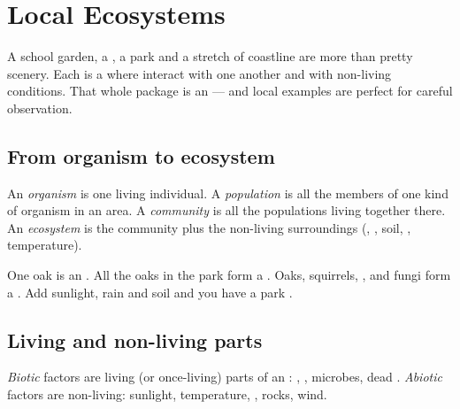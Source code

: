 \chapter{Local Ecosystems}\label{ch:g4:ecosystems}

A school garden, a , a park and a stretch of coastline are more than
pretty scenery. Each is a  where  interact with one
another and with non-living conditions. That whole package is an
 --- and local examples are perfect for careful observation.

\section{From organism to ecosystem}

\begin{definition}\label{def:g4:ecosystems:levels}
An \emph{organism} is one living individual. A
\emph{population} is all the members of one kind of
organism in an area. A \emph{community} is all the
populations living together there. An
\emph{ecosystem} is the community plus the non-living
surroundings (, , soil, , temperature).
\end{definition}

\begin{example}\label{ex:g4:ecosystems:park}
One oak is an . All the oaks in the park form a .
Oaks, squirrels, ,  and fungi form a . Add
sunlight, rain and soil and you have a park .
\end{example}

\section{Living and non-living parts}

\begin{definition}\label{def:g4:ecosystems:bio-abio}
\emph{Biotic} factors are living (or once-living) parts of
an : , , microbes, dead . \emph{Abiotic}
 factors are non-living: sunlight, temperature, ,
rocks, wind.
\end{definition}


